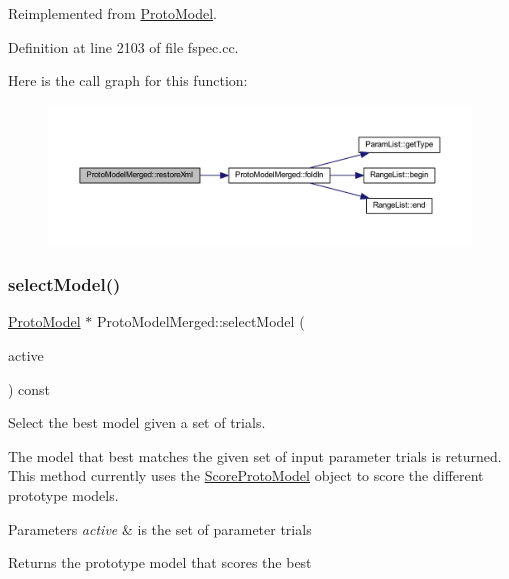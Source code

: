 Reimplemented from \mbox{\hyperlink{class_proto_model_a8fe30abbc7fe1c709b1b8fe9c81803b8}{Proto\+Model}}.



Definition at line 2103 of file fspec.\+cc.

Here is the call graph for this function\+:
\nopagebreak
\begin{figure}[H]
\begin{center}
\leavevmode
\includegraphics[width=350pt]{class_proto_model_merged_a1c80c617c086b0edacb483f8315d12e9_cgraph}
\end{center}
\end{figure}
\mbox{\label{class_proto_model_merged_a3679cbe7a72e251e72d9b7140c0fac40}} 
\subsubsection{\texorpdfstring{selectModel()}{selectModel()}}
{\footnotesize\ttfamily \mbox{\hyperlink{class_proto_model}{Proto\+Model}} $\ast$ Proto\+Model\+Merged\+::select\+Model (\begin{DoxyParamCaption}\item[{\mbox{\hyperlink{class_param_active}{Param\+Active}} $\ast$}]{active }\end{DoxyParamCaption}) const}



Select the best model given a set of trials. 

The model that best matches the given set of input parameter trials is returned. This method currently uses the \mbox{\hyperlink{class_score_proto_model}{Score\+Proto\+Model}} object to score the different prototype models. 
\begin{DoxyParams}{Parameters}
{\em active} & is the set of parameter trials \\
\hline
\end{DoxyParams}
\begin{DoxyReturn}{Returns}
the prototype model that scores the best 
\end{DoxyReturn}


